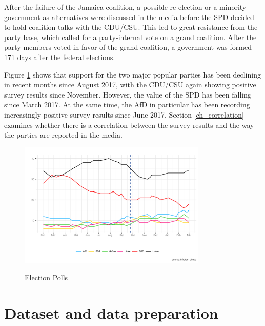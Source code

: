 \documentclass[12pt,a4paper,notitlepage]{article}
\begin{document}
After the failure of the Jamaica coalition, a possible re-election or a minority government as alternatives were discussed in the media before the SPD decided to hold coalition talks with the CDU/CSU. This led to great resistance from the party base, which called for a party-internal vote on a grand coalition. After the party members voted in favor of the grand coalition, a government was formed 171 days after the federal elections. 

Figure \ref{fig_polls} shows that support for the two major popular parties has been declining in recent months since August 2017, with the CDU/CSU again showing positive survey results since November. However, the value of the SPD has been falling since March 2017. At the same time, the AfD in particular has been recording increasingly positive survey results since June 2017. Section \ref{ch_correlation} examines whether there is a correlation between the survey results and the way the parties are reported in the media. 

\begin{figure}[H]
\begin{center}
	\caption{Election Polls}
	\includegraphics[width=0.8\textwidth]{../figs/polls.png}
	\label{fig_polls}
	\end{center}
\end{figure}

\section{Dataset and data preparation}\label{ch_data}
\end{document}
